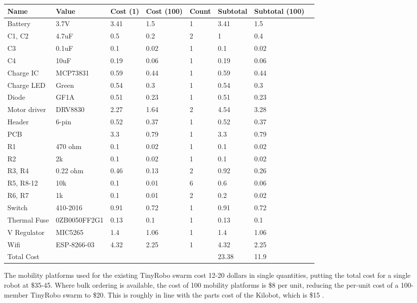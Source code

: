  \begin{table}
	\begin{tabular}{l l l l l l l l }
	Name & Value & Cost (1) & Cost (100) & Count & Subtotal & Subtotal (100)\\
 	\hline
Battery & 3.7V & 3.41 & 1.5 & 1 & 3.41 & 1.5\\
C1, C2 & 4.7uF & 0.5 & 0.2 & 2 & 1 & 0.4\\
C3 & 0.1uF & 0.1 & 0.02 & 1 & 0.1 & 0.02\\
C4 & 10uF & 0.19 & 0.06 & 1 & 0.19 & 0.06\\
Charge IC & MCP73831 & 0.59 & 0.44 & 1 & 0.59 & 0.44\\
Charge LED & Green & 0.54 & 0.3 & 1 & 0.54 & 0.3\\
Diode & GF1A & 0.51 & 0.23 & 1 & 0.51 & 0.23\\
Motor driver & DRV8830 & 2.27 & 1.64 & 2 & 4.54 & 3.28\\
Header & 6-pin  & 0.52 & 0.37 & 1 & 0.52 & 0.37\\
PCB &  & 3.3 & 0.79 & 1 & 3.3 & 0.79\\
R1 & 470 ohm & 0.1 & 0.02 & 1 & 0.1 & 0.02\\
R2 & 2k & 0.1 & 0.02 & 1 & 0.1 & 0.02\\
R3, R4 & 0.22 ohm & 0.46 & 0.13 & 2 & 0.92 & 0.26\\
R5, R8-12 & 10k & 0.1 & 0.01 & 6 & 0.6 & 0.06\\
R6, R7 & 1k & 0.1 & 0.01 & 2 & 0.2 & 0.02\\
Switch & 410-2016 & 0.91 & 0.72 & 1 & 0.91 & 0.72\\
Thermal Fuse & 0ZB0050FF2G1 & 0.13 & 0.1 & 1 & 0.13 & 0.1\\
V Regulator & MIC5265 & 1.4 & 1.06 & 1 & 1.4 & 1.06\\
Wifi & ESP-8266-03 & 4.32 & 2.25 & 1 & 4.32 & 2.25\\
\hline
Total Cost &  &  &  &  & 23.38 & 11.9\\
 	\end{tabular}
 \end{table}

The mobility platforms used for the existing TinyRobo swarm cost 12-20 dollars in single quantities, putting the total cost for a single robot at \$35-45.
Where bulk ordering is available, the cost of 100 mobility platforms is \$8 per unit, reducing the per-unit cost of a 100-member TinyRobo swarm to \$20. 
This is roughly in line with the parts cost of the Kilobot, which is \$15 \citep{rubenstein2014kilobot}.

